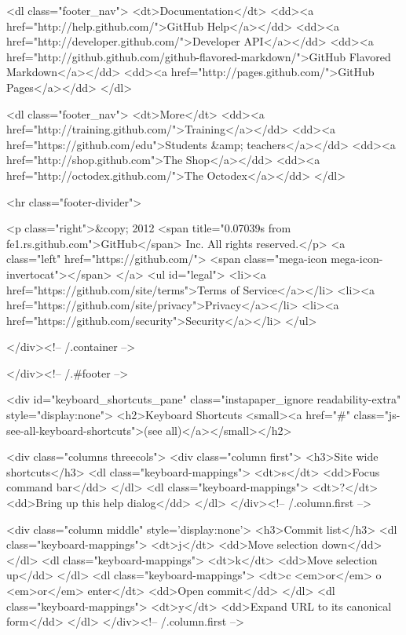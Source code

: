       <dl class="footer_nav">
        <dt>Documentation</dt>
        <dd><a href="http://help.github.com/">GitHub Help</a></dd>
        <dd><a href="http://developer.github.com/">Developer API</a></dd>
        <dd><a href="http://github.github.com/github-flavored-markdown/">GitHub Flavored Markdown</a></dd>
        <dd><a href="http://pages.github.com/">GitHub Pages</a></dd>
      </dl>

      <dl class="footer_nav">
        <dt>More</dt>
        <dd><a href="http://training.github.com/">Training</a></dd>
        <dd><a href="https://github.com/edu">Students &amp; teachers</a></dd>
        <dd><a href="http://shop.github.com">The Shop</a></dd>
        <dd><a href="http://octodex.github.com/">The Octodex</a></dd>
      </dl>

      <hr class="footer-divider">


    <p class="right">&copy; 2012 <span title="0.07039s from fe1.rs.github.com">GitHub</span> Inc. All rights reserved.</p>
    <a class="left" href="https://github.com/">
      <span class="mega-icon mega-icon-invertocat"></span>
    </a>
    <ul id="legal">
        <li><a href="https://github.com/site/terms">Terms of Service</a></li>
        <li><a href="https://github.com/site/privacy">Privacy</a></li>
        <li><a href="https://github.com/security">Security</a></li>
    </ul>

  </div><!-- /.container -->

</div><!-- /.#footer -->


    

<div id="keyboard_shortcuts_pane" class="instapaper_ignore readability-extra" style="display:none">
  <h2>Keyboard Shortcuts <small><a href="#" class="js-see-all-keyboard-shortcuts">(see all)</a></small></h2>

  <div class="columns threecols">
    <div class="column first">
      <h3>Site wide shortcuts</h3>
      <dl class="keyboard-mappings">
        <dt>s</dt>
        <dd>Focus command bar</dd>
      </dl>
      <dl class="keyboard-mappings">
        <dt>?</dt>
        <dd>Bring up this help dialog</dd>
      </dl>
    </div><!-- /.column.first -->

    <div class="column middle" style='display:none'>
      <h3>Commit list</h3>
      <dl class="keyboard-mappings">
        <dt>j</dt>
        <dd>Move selection down</dd>
      </dl>
      <dl class="keyboard-mappings">
        <dt>k</dt>
        <dd>Move selection up</dd>
      </dl>
      <dl class="keyboard-mappings">
        <dt>c <em>or</em> o <em>or</em> enter</dt>
        <dd>Open commit</dd>
      </dl>
      <dl class="keyboard-mappings">
        <dt>y</dt>
        <dd>Expand URL to its canonical form</dd>
      </dl>
    </div><!-- /.column.first -->

